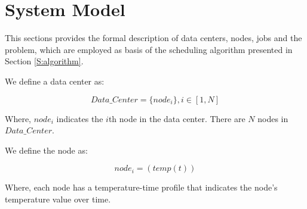 


\section{System Model}
This sections provides the formal description of data centers, nodes, jobs and the problem, which are employed as basis of the scheduling algorithm presented in Section \ref{S:algorithm}.

We define a data center as: 

\begin{equation}
Data\_Center=\{node_i\}, i\in [1,N]
\end{equation}


Where, $node_i$ indicates the $i$th node in the data center. There are $N$ nodes in $Data\_Center$.




We define the node as:

\begin{equation}
node_i=( temp(t) )
\end{equation}

Where, each node has a temperature-time profile that indicates the node's temperature value over time.

